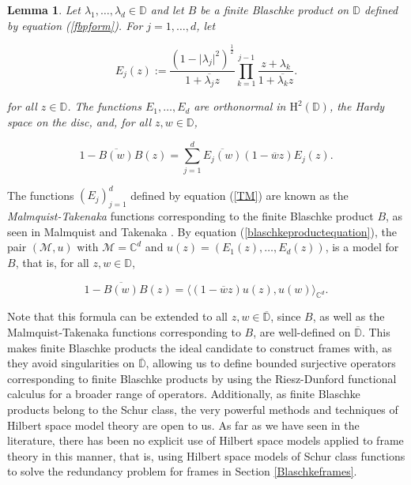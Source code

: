 \documentclass[10pt, reqno]{amsart}
\newtheorem{lemma}[theorem]{Lemma}
\theoremstyle{definition}
\numberwithin{equation}{section}
\begin{document}
\begin{lemma}{}\label{blasckhelemma}
    Let $\lambda_{1},\hdots,\lambda_{d}\in\mathbb{D}$ and let $B$ be a finite Blaschke product on $\mathbb{D}$ defined by equation (\ref{fbpform}). For $j=1,\hdots,d$, let 

\begin{equation}\label{TM}
    E_{j}(z):=\dfrac{(1-\lvert\lambda_{j}\rvert^{2})^{\frac{1}{2}}}{1+\overline{\lambda_{j}}z}\prod_{k=1}^{j-1}\dfrac{z+\lambda_{k}}{1+\overline{\lambda_{k}}z}.
\end{equation}

\noindent for all $z\in\mathbb{D}$. The functions $E_{1},\hdots,E_{d}$ are orthonormal in $\mathrm{H}^{2}(\mathbb{D})$, the Hardy space on the disc, and, for all $z,w\in\mathbb{D}$, 

\begin{equation}\label{blaschkeproductequation}
    1-\overline{B(w)}B(z)=\sum_{j=1}^{d}\overline{E_{j}(w)}(1-\overline{w}z)E_{j}(z).
\end{equation}

\end{lemma}

\noindent The functions $(E_{j})_{j=1}^{d}$ defined by equation (\ref{TM}) are known as the {\it{Malmquist-Takenaka}} functions corresponding to the finite Blaschke product $B$, as seen in Malmquist \cite{Malm} and Takenaka \cite{TM}. By equation (\ref{blaschkeproductequation}), the pair $(\mathcal{M},u)$ with $\mathcal{M}=\mathbb{C}^{d}$ and $u(z) = (E_{1}(z),\hdots,E_{d}(z))$, is a model for $B$, that is, for all $z,w\in\mathbb{D}$,

$$1-\overline{B(w)}B(z)=\Big\langle(1-\overline{w}z)u(z),u(w)\Big\rangle_{\mathbb{C}^{d}}.$$

\noindent Note that this formula can be extended to all $z,w\in\overline{\mathbb{D}}$, since $B$, as well as the Malmquist-Takenaka functions corresponding to $B$, are well-defined on $\overline{\mathbb{D}}$. This makes finite Blaschke products the ideal candidate to construct frames with, as they avoid singularities on $\overline{\mathbb{D}}$, allowing us to define bounded surjective operators corresponding to finite Blaschke products by using the Riesz-Dunford functional calculus for a broader range of operators. Additionally, as finite Blaschke products belong to the Schur class, the very powerful methods and techniques of Hilbert space model theory are open to us. As far as we have seen in the literature, there has been no explicit use of Hilbert space models applied to frame theory in this manner, that is, using Hilbert space models of Schur class functions to solve the redundancy problem for frames in Section \ref{Blaschkeframes}.
\end{document}
